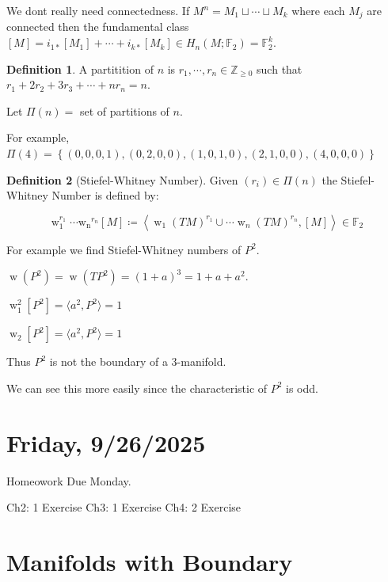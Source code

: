 \documentclass{article}
\theoremstyle{definition}
\newtheorem*{definition}{Definition}
\begin{document}
    We dont really need connectedness. If \(M^n = M_1 \sqcup \cdots \sqcup M_k\) where each \(M_j\) are connected then the fundamental class \([M] = i_{1 \ast} [M_1] + \cdots + i_{k \ast} [M_k] \in H_n(M;\mathbb{F}_2) = \mathbb{F}_2^k\).

    \begin{definition}
        A partitition of \(n\) is \(r_1, \cdots , r_n \in \mathbb{Z}_{\geq 0}\) such that \(r_1 + 2r_2 + 3r_3 + \cdots + nr_n = n\).

        Let \(\Pi(n) =\) set of partitions of \(n\).

        For example, \(\Pi(4) = \left\{ (0,0,0,1),(0,2,0,0),(1,0,1,0),(2,1,0,0),(4,0,0,0)\right\} \) 
    \end{definition}

    \begin{definition}
        [Stiefel-Whitney Number] Given \((r_i) \in \Pi(n)\) the Stiefel-Whitney Number is defined by:

        \[
            \operatorname{w}_1^{r_1} \cdots \operatorname{w_n}^{r_n} [M] \coloneqq \left\langle \operatorname{w}_1(TM)^{r_1} \cup \cdots \operatorname{w}_n(TM)^{r_n}, [M] \right\rangle \in \mathbb{F}_2
        \]
    \end{definition}

    For example we find Stiefel-Whitney numbers of \(P^2\).

    \(\operatorname{w}(P^2) = \operatorname{w}(TP^2) = (1+a)^3 = 1+a+a^2\).

    \(\operatorname{w}_1^2 [P^2] = \langle a^2, P^2 \rangle = 1\) 

    \(\operatorname{w}_2 [P^2] = \langle a^2, P^2 \rangle = 1\)

    Thus \(P^2\) is not the boundary of a \(3\)-manifold.

    We can see this more easily since the characteristic of \(P^2\) is odd.

    \section*{Friday, 9/26/2025}
    
    Homeowork Due Monday.

    Ch2: 1 Exercise
    Ch3: 1 Exercise
    Ch4: 2 Exercise

    \section*{Manifolds with Boundary}
\end{document}
